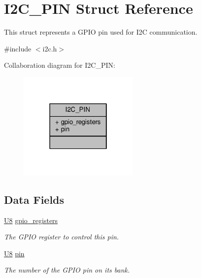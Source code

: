 \hypertarget{struct_i2_c___p_i_n}{}\section{I2\+C\+\_\+\+P\+I\+N Struct Reference}
\label{struct_i2_c___p_i_n}


This struct represents a G\+P\+I\+O pin used for I2\+C communication.  




{\ttfamily \#include $<$i2c.\+h$>$}



Collaboration diagram for I2\+C\+\_\+\+P\+I\+N\+:\nopagebreak
\begin{figure}[H]
\begin{center}
\leavevmode
\includegraphics[width=166pt]{struct_i2_c___p_i_n__coll__graph}
\end{center}
\end{figure}
\subsection*{Data Fields}
\begin{DoxyCompactItemize}
\item 
\hypertarget{struct_i2_c___p_i_n_a330fb1f866557aa4731cfc091e62066a}{}\hyperlink{mytypes_8h_a3cb25ca6f51f003950f9625ff05536fc}{U8} \hyperlink{struct_i2_c___p_i_n_a330fb1f866557aa4731cfc091e62066a}{gpio\+\_\+registers}\label{struct_i2_c___p_i_n_a330fb1f866557aa4731cfc091e62066a}

\begin{DoxyCompactList}\small\item\em The G\+P\+I\+O register to control this pin. \end{DoxyCompactList}\item 
\hypertarget{struct_i2_c___p_i_n_a14ccbbc47dccaade3a6b3a2d9704b8e0}{}\hyperlink{mytypes_8h_a3cb25ca6f51f003950f9625ff05536fc}{U8} \hyperlink{struct_i2_c___p_i_n_a14ccbbc47dccaade3a6b3a2d9704b8e0}{pin}\label{struct_i2_c___p_i_n_a14ccbbc47dccaade3a6b3a2d9704b8e0}

\begin{DoxyCompactList}\small\item\em The number of the G\+P\+I\+O pin on its bank. \end{DoxyCompactList}\end{DoxyCompactItemize}


